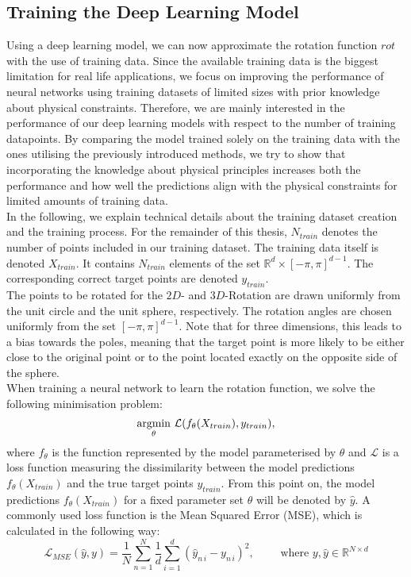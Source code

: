 \subsection{Training the Deep Learning Model}
\indent Using a deep learning model, we can now approximate the rotation function $rot$ with the use of training data. Since the available training data is the biggest limitation for real life applications, we focus on improving the performance of neural networks using training datasets of limited sizes with prior knowledge about physical constraints. Therefore, we are mainly interested in the performance of our deep learning models with respect to the number of training datapoints. By comparing the model trained solely on the training data with the ones utilising the previously introduced methods, we try to show that incorporating the knowledge about physical principles increases both the performance and how well the predictions align with the physical constraints for limited amounts of training data. \\
\indent In the following, we explain technical details about the training dataset creation and the training process. For the remainder of this thesis, $N_{train}$ denotes the number of points included in our training dataset. The training data itself is denoted $X_{train}$. It contains $N_{train}$ elements of the set $\mathbb{R}^{d} \times [- \pi, \pi] ^{d-1}$. The corresponding correct target points are denoted $y_{train}$.\\
\indent The points to be rotated for the $2D$- and $3D$-Rotation are drawn uniformly from the unit circle and the unit sphere, respectively. The rotation angles are chosen uniformly from the set $[-\pi, \pi]^{d-1}$. Note that for three dimensions, this leads to a bias towards the poles, meaning that the target point is more likely to be either close to the original point or to the point located exactly on the opposite side of the sphere.\\
\indent When training a neural network to learn the rotation function, we solve the following minimisation problem:
\[\underset{\theta}{\operatorname*{argmin}} \,\, \mathcal{L}(f_{\theta} (X_{train}), y_{train}), \]
where $f_\theta$ is the function represented by the model parameterised by $\theta$ and $\mathcal{L}$ is a loss function measuring the dissimilarity between the model predictions $f_{\theta} (X_{train})$ and the true target points $y_{train}$. From this point on, the model predictions $f_{\theta} (X_{train})$ for a fixed parameter set $\theta$ will be denoted by $\hat{y}$.
A commonly used loss function is the Mean Squared Error (MSE), which is calculated in the following way:
\begin{equation}
\label{eq:mse}
\mathcal{L}_{MSE}(\hat{y}, y) = \frac{1}{N}\sum_{n = 1}^{N} \frac{1}{d} \sum_{i = 1}^{d} (\hat{y}_{n\,i} - y_{n\,i})^2, \qquad \text{ where } y, \hat{y} \in \mathbb{R}^{N \times d}
\end{equation}

